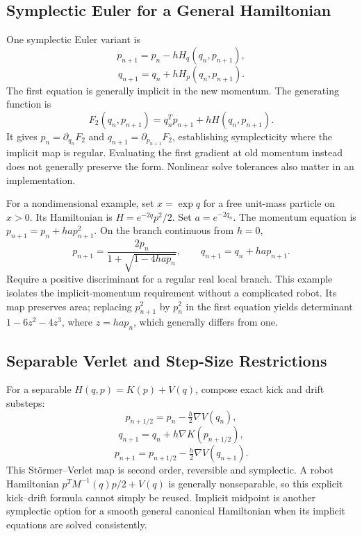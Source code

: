 \subsection{Symplectic Euler for a General Hamiltonian}
\label{subsec:lagrangian_symplectic_euler}

One symplectic Euler variant is
\begin{equation}
p_{n+1}=p_n-hH_q(q_n,p_{n+1}),
\label{eq:symp_euler_p}
\end{equation}
\begin{equation}
q_{n+1}=q_n+hH_p(q_n,p_{n+1}).
\label{eq:symp_euler_q}
\end{equation}
The first equation is generally implicit in the new momentum. The generating function is
\begin{equation}
F_2(q_n,p_{n+1})=q_n^Tp_{n+1}+hH(q_n,p_{n+1}).
\end{equation}
It gives $p_n=\partial_{q_n}F_2$ and $q_{n+1}=\partial_{p_{n+1}}F_2$, establishing symplecticity where the implicit map is regular. Evaluating the first gradient at old momentum instead does not generally preserve the form. Nonlinear solve tolerances also matter in an implementation.

For a nondimensional example, set $x=\exp q$ for a free unit-mass particle on $x>0$. Its Hamiltonian is $H=e^{-2q}p^2/2$. Set $a=e^{-2q_n}$. The momentum equation is $p_{n+1}=p_n+ha p_{n+1}^2$. On the branch continuous from $h=0$,
\begin{equation}
p_{n+1}=\frac{2p_n}{1+\sqrt{1-4ha p_n}},\qquad
q_{n+1}=q_n+ha p_{n+1}.
\label{eq:lagrangian_variable_mass_step}
\end{equation}
Require a positive discriminant for a regular real local branch. This example isolates the implicit-momentum requirement without a complicated robot. Its map preserves area; replacing $p_{n+1}^2$ by $p_n^2$ in the first equation yields determinant $1-6z^2-4z^3$, where $z=ha p_n$, which generally differs from one.

\subsection{Separable Verlet and Step-Size Restrictions}
\label{subsec:lagrangian_verlet}

For a separable $H(q,p)=K(p)+V(q)$, compose exact kick and drift substeps:
\begin{equation}
p_{n+1/2}=p_n-\tfrac h2\nabla V(q_n),
\label{eq:verlet_half_p}
\end{equation}
\begin{equation}
q_{n+1}=q_n+h\nabla K(p_{n+1/2}),
\label{eq:verlet_q}
\end{equation}
\begin{equation}
p_{n+1}=p_{n+1/2}-\tfrac h2\nabla V(q_{n+1}).
\label{eq:verlet_p}
\end{equation}
This Störmer--Verlet map is second order, reversible and symplectic. A robot Hamiltonian $p^TM^{-1}(q)p/2+V(q)$ is generally nonseparable, so this explicit kick--drift formula cannot simply be reused. Implicit midpoint is another symplectic option for a smooth general canonical Hamiltonian when its implicit equations are solved consistently.

